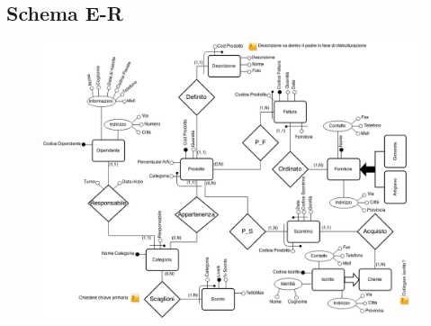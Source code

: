 \begin{landscape}

\subsection{Schema E-R}

\begin{figure}[h!]
  \centering
  \includegraphics[scale=0.4]{include/progettazioneConcettuale/schemaER/PreNorm}
\end{figure}


\end{landscape}
